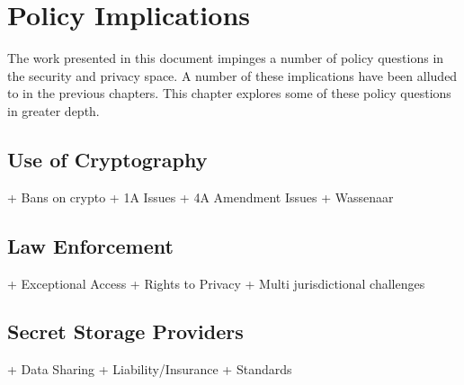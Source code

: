 \chapter{Policy Implications}
\label{chap:policy}

The work presented in this document impinges a number of policy
questions in the security and privacy space. A number of these
implications have been alluded to in the previous chapters. This
chapter explores some of these policy questions in greater depth.

\section{Use of Cryptography}
\label{chap:policy:crypto}

+ Bans on crypto
+ 1A Issues
+ 4A Amendment Issues
+ Wassenaar

\section{Law Enforcement}
\label{chap:policy:leo}

+ Exceptional Access
+ Rights to Privacy
+ Multi jurisdictional challenges

\section{Secret Storage Providers}
\label{chap:policy:ssp}

+ Data Sharing
+ Liability/Insurance
+ Standards
